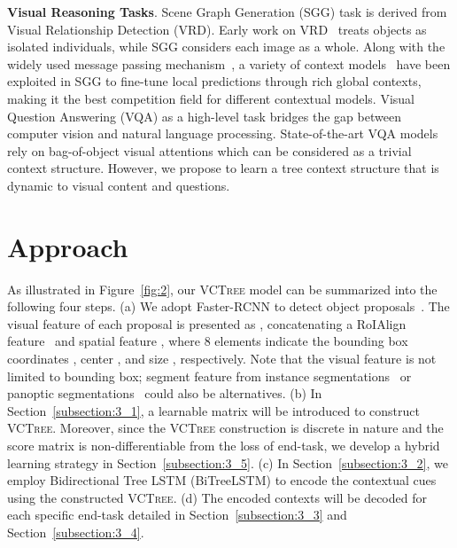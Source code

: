 \documentclass[10pt,twocolumn,letterpaper]{article}
\begin{document}
\noindent\textbf{Visual Reasoning Tasks}. Scene Graph Generation (SGG) task is derived from Visual Relationship Detection (VRD). Early work on VRD~\cite{lu2016visual} treats objects as isolated individuals, while SGG considers each image as a whole. Along with the widely used message passing mechanism~\cite{xu2017scene}, a variety of context models~\cite{li2018factorizable, li2017scene,newell2017pixels, Yang_2018_ECCV} have been exploited in SGG to fine-tune local predictions through rich global contexts, making it the best competition field for different contextual models. Visual Question Answering (VQA) as a high-level task bridges the gap between computer vision and natural language processing. State-of-the-art VQA models~\cite{anderson2018bottom, bai2018deep, Teney_2018_CVPR} rely on bag-of-object visual attentions which can be considered as a trivial context structure. However, we propose to learn a tree context structure that is dynamic to visual content and questions.

\section{Approach}
\label{section3}
As illustrated in Figure~\ref{fig:2}, our \textsc{VCTree} model can be summarized into the following four steps. (a) We adopt Faster-RCNN to detect object proposals~\cite{ren2015faster}. The visual feature of each proposal  is presented as , concatenating a RoIAlign feature~\cite{he2017mask}  and spatial feature , where 8 elements indicate the bounding box coordinates , center , and size , respectively. Note that the visual feature  is not limited to bounding box; segment feature from instance segmentations~\cite{he2017mask} or panoptic segmentations~\cite{kirillov2018panoptic} could also be alternatives. (b) In Section~\ref{subsection:3_1}, a learnable matrix will be introduced to construct \textsc{VCTree}. Moreover, since the \textsc{VCTree} construction is discrete in nature and the score matrix is non-differentiable from the loss of end-task, we develop a hybrid learning strategy in Section~\ref{subsection:3_5}. (c) In Section~\ref{subsection:3_2}, we employ Bidirectional Tree LSTM (BiTreeLSTM) to encode the contextual cues using the constructed \textsc{VCTree}. (d) The encoded contexts will be decoded for each specific end-task detailed in Section~\ref{subsection:3_3} and Section~\ref{subsection:3_4}. 
\end{document}
